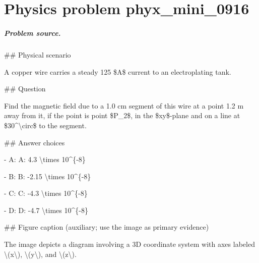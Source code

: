 
\chapter{Physics problem phyx\_mini\_0916}
\label{ch:PhyXMiniProblems_problem_phyx_mini_0916}

\paragraph{Problem source.}
\#\# Physical scenario

A copper wire carries a steady 125 \$A\$ current to an electroplating tank.

\#\# Question

Find the magnetic field due to a 1.0 cm segment of this wire at a point 1.2 m away from it, if the point is point \$P\_2\$, in the \$xy\$-plane and on a line at \$30\textasciicircum{}\textbackslash{}circ\$ to the segment.

\#\# Answer choices

- A: A: 4.3 \textbackslash{}times 10\textasciicircum{}\{-8\}

- B: B: -2.15 \textbackslash{}times 10\textasciicircum{}\{-8\}

- C: C: -4.3 \textbackslash{}times 10\textasciicircum{}\{-8\}

- D: D: -4.7 \textbackslash{}times 10\textasciicircum{}\{-8\}

\#\# Figure caption (auxiliary; use the image as primary evidence)

The image depicts a diagram involving a 3D coordinate system with axes labeled \textbackslash{}(x\textbackslash{}), \textbackslash{}(y\textbackslash{}), and \textbackslash{}(z\textbackslash{}). 

